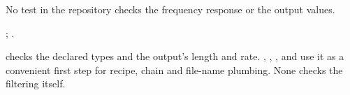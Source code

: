 No test in the repository checks the frequency response or the output values.

\citet{butterworth1930theory}; \citet{virtanen2020scipy}.

 checks the declared types and the output's length and
rate. , ,
,  and
 use it as a convenient first step for recipe, chain and file-name
plumbing. None checks the filtering itself.

